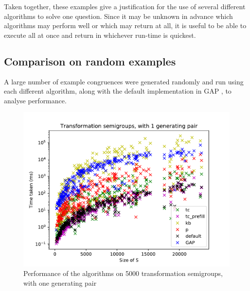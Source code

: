 
Taken together, these examples give a justification for the use of several
different algorithms to solve one question.  Since it may be unknown in advance
which algorithms may perform well or which may return at all, it is useful to be
able to execute all at once and return in whichever run-time is quickest.

\subsection{Comparison on random examples}
A large number of example congruences were generated randomly and run using each
different algorithm, along with the default implementation in GAP \cite{gap}, to
analyse performance.

\begin{figure}[h]
  \centering
  \includegraphics[width=\textwidth]{pics/ch-pairs/bench-trans-1p-times}
  \caption{Performance of the algorithms on 5000 transformation semigroups, with
    one generating pair}
  \label{fig:bench-trans-1p-times}
\end{figure}

